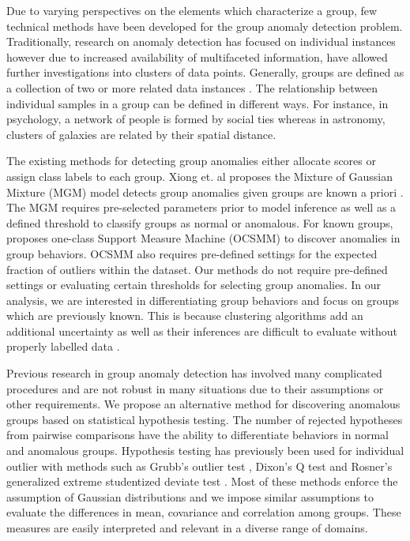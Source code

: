 Due to varying perspectives on the elements which characterize a group, few technical methods have been developed for the group anomaly detection problem. Traditionally, research on anomaly detection has focused on individual instances however due to increased availability of multifaceted information, have allowed further investigations into clusters of data points.
Generally, groups are defined as a collection of two or more related data instances \cite{Forsyth}. The relationship between individual samples in a group can be defined in different ways. For instance, in psychology, a network of people is formed by social ties whereas in astronomy, clusters of galaxies are related by their spatial distance. 








The existing methods for detecting group anomalies either allocate scores or assign class labels to each group.
Xiong et. al proposes the Mixture of Gaussian Mixture (MGM) model detects group anomalies given groups are known a priori \cite{MGMM}. The MGM requires pre-selected parameters prior to model inference as well as a defined threshold to classify groups as normal or anomalous.
For known groups, \cite{OCSMM} proposes one-class Support Measure Machine (OCSMM) to discover anomalies in group behaviors. OCSMM also requires pre-defined settings for the expected fraction of outliers within the dataset. Our methods do not require pre-defined settings or evaluating certain thresholds for selecting group anomalies.
In our analysis, we are interested in differentiating group behaviors and focus on groups which are previously known. This is because clustering algorithms add an additional uncertainty as well as their inferences are difficult to evaluate without properly labelled data \cite{ClusterEval, ClusteringValidity}.

Previous research in group anomaly detection has involved many complicated procedures and are not robust in many situations due to their assumptions or other requirements.
We propose an alternative method for discovering anomalous groups based on statistical hypothesis testing. The number of rejected hypotheses from  pairwise comparisons have the ability to differentiate behaviors in normal and anomalous groups.  Hypothesis testing has previously been used for individual outlier with methods such as Grubb's outlier test \cite{Grubb}, Dixon's Q test \cite{Dixon} and Rosner's generalized extreme studentized deviate test \cite{Rosner}. Most of these methods enforce the assumption of Gaussian distributions and we impose similar assumptions to evaluate the differences in mean, covariance and correlation among groups. These measures are easily interpreted and relevant in a diverse range of domains.





